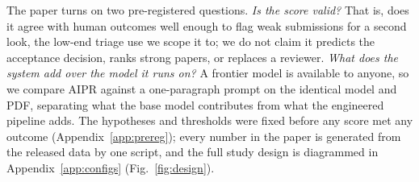 The paper turns on two pre-registered questions. \emph{Is the score valid?} That is, does
it agree with human outcomes well enough to flag weak submissions for a second look, the
low-end triage use we scope it to; we do not claim it predicts the acceptance decision,
ranks strong papers, or replaces a reviewer. \emph{What does the system add over the model
it runs on?} A frontier model is available to anyone, so we compare AIPR against a
one-paragraph prompt on the identical model and PDF, separating what the base model
contributes from what the engineered pipeline adds. The hypotheses and thresholds were
fixed before any score met any outcome (Appendix~\ref{app:prereg}); every number in the
paper is generated from the released data by one script, and the full study design is
diagrammed in Appendix~\ref{app:configs} (Fig.~\ref{fig:design}).
